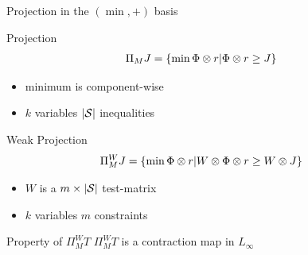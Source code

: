 \documentclass[10pt]{beamer}
\begin{document}
\begin{frame}[fragile]{Projection in the $(\min,+)$ basis}

\begin{block}{Projection}
{\begin{align*}
\Pi_M J&=\{\min \Phi \om r | \Phi \om r \geq J\}
\end{align*}}
\end{block}
\vspace{-10pt}
\begin{itemize}
\item minimum is component-wise
\item $k$ variables $|\S|$ inequalities
\end{itemize}
\p
\begin{block}{Weak Projection}
{\begin{align*}
\Pi^W_M J&=\{\min \Phi \om r | W\om \Phi \om r \geq W\om J\}
\end{align*}}
\end{block}
\vspace{-10pt}
\begin{itemize}
\item {{$W$}} is a $m\times |\S|$ test-matrix
\item $k$ variables $m$ constraints
\end{itemize}
\p
\begin{block}{Property of $\Pi^W_M T$}
{{$\Pi^W_M T$ }}is a contraction map in $L_\infty$
\end{block}
\begin{center}{\color{orange}{No Norm Mismatch}}\end{center}
\end{frame}
\end{document}

